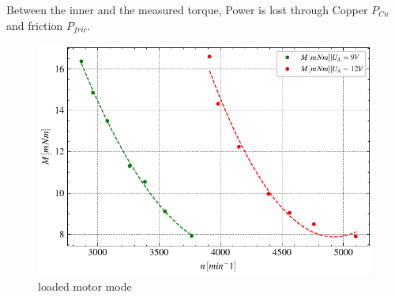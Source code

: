 \documentclass[conference]{IEEEtran}
\begin{document}
Between the inner and the measured torque, Power is lost through Copper $P_{Cu}$ and friction $ P_{fric}$.






\begin{figure}[htbp]
    \centering
    \includegraphics[width=\columnwidth]{plots/4.3_Belasteter_Motor_UA9V_12V.pdf}
    \caption{loaded motor mode}
    \label{fig:Anlaufmoment}
\end{figure}
\end{document}
